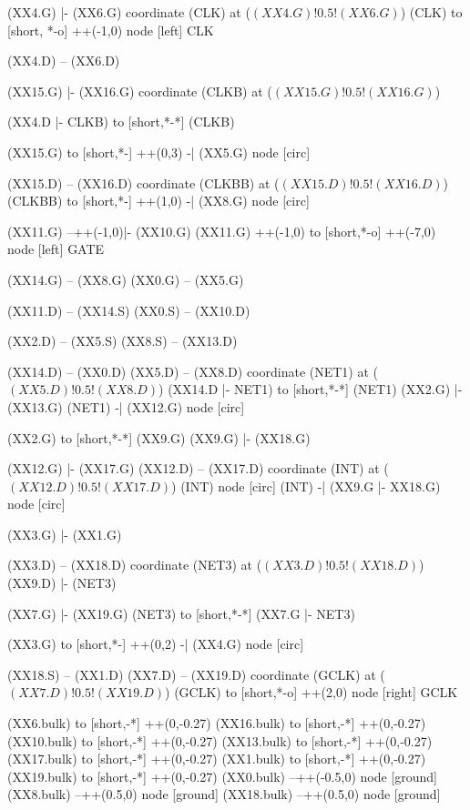 \begin{circuitikz}[american]
	(XX4.G) |- (XX6.G)
	coordinate (CLK) at ($(XX4.G)!0.5!(XX6.G)$)
	(CLK) to [short, *-o] ++(-1,0) node [left] {CLK}
	
	(XX4.D) -- (XX6.D)

	(XX15.G) |- (XX16.G)
	coordinate (CLKB) at ($(XX15.G)!0.5!(XX16.G)$)
	
	(XX4.D |- CLKB) to [short,*-*] (CLKB)
	
	(XX15.G) to [short,*-] ++(0,3) -| (XX5.G) node [circ] {}
	
	(XX15.D) -- (XX16.D)
	coordinate (CLKBB) at ($(XX15.D)!0.5!(XX16.D)$)
	(CLKBB) to [short,*-] ++(1,0) -| (XX8.G) node [circ] {}
	
	
	(XX11.G) --++(-1,0)|- (XX10.G) 
	(XX11.G) ++(-1,0) to [short,*-o] ++(-7,0) node [left] {GATE}
	
	(XX14.G) -- (XX8.G)
	(XX0.G) -- (XX5.G)
	
	(XX11.D) -- (XX14.S)
	(XX0.S) -- (XX10.D)

	
	(XX2.D) -- (XX5.S)
	(XX8.S) -- (XX13.D)
	
	(XX14.D) -- (XX0.D)
	(XX5.D) -- (XX8.D)
	coordinate (NET1) at ($(XX5.D)!0.5!(XX8.D)$)
	(XX14.D |- NET1) to [short,*-*] (NET1) 
	(XX2.G) |- (XX13.G)
	(NET1) -| (XX12.G) node [circ] {}
	
	(XX2.G) to [short,*-*] (XX9.G)
	(XX9.G) |- (XX18.G)
	
	(XX12.G) |- (XX17.G)
	(XX12.D) -- (XX17.D)
	coordinate (INT) at ($(XX12.D)!0.5!(XX17.D)$) 
	(INT) node [circ] {}
	(INT) -| (XX9.G |- XX18.G) node [circ] {}
	
	(XX3.G) |- (XX1.G)
	
	(XX3.D) -- (XX18.D)
	coordinate (NET3) at ($(XX3.D)!0.5!(XX18.D)$) 
	(XX9.D) |- (NET3) 
	
	(XX7.G) |- (XX19.G)
	(NET3) to [short,*-*] (XX7.G |- NET3)
	
	(XX3.G) to [short,*-] ++(0,2) -| (XX4.G) node [circ] {}
	
	(XX18.S) -- (XX1.D)
	(XX7.D) -- (XX19.D) 
	coordinate (GCLK) at ($(XX7.D)!0.5!(XX19.D)$) 
	(GCLK) to [short,*-o] ++(2,0) node [right] {GCLK}
	
	(XX6.bulk) to [short,-*] ++(0,-0.27)
	(XX16.bulk) to [short,-*] ++(0,-0.27)
	(XX10.bulk) to [short,-*] ++(0,-0.27)
	(XX13.bulk) to [short,-*] ++(0,-0.27)
	(XX17.bulk) to [short,-*] ++(0,-0.27)
	(XX1.bulk) to [short,-*] ++(0,-0.27)
	(XX19.bulk) to [short,-*] ++(0,-0.27)
	(XX0.bulk) --++(-0.5,0) node [ground]{}
	(XX8.bulk) --++(0.5,0) node [ground]{}
	(XX18.bulk) --++(0.5,0) node [ground]{}


\end{circuitikz}

